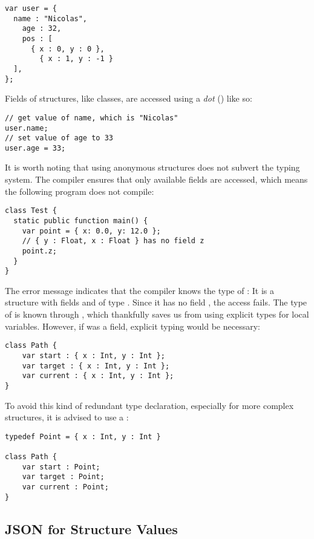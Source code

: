 {

\begin{lstlisting}
var user = {
  name : "Nicolas",
	age : 32,
	pos : [
	  { x : 0, y : 0 },
		{ x : 1, y : -1 }
  ],
};
\end{lstlisting}
Fields of structures, like classes, are accessed using a \emph{dot} () like so:

\begin{lstlisting}
// get value of name, which is "Nicolas"
user.name;
// set value of age to 33
user.age = 33;
\end{lstlisting}
It is worth noting that using anonymous structures does not subvert the typing system. The compiler ensures that only available fields are accessed, which means the following program does not compile:

\begin{lstlisting}
class Test {
  static public function main() {
    var point = { x: 0.0, y: 12.0 };
    // { y : Float, x : Float } has no field z
    point.z;
  }
}
\end{lstlisting}
The error message indicates that the compiler knows the type of : It is a structure with fields  and  of type . Since it has no field , the access fails.
The type of  is known through , which thankfully saves us from using explicit types for local variables. However, if  was a field, explicit typing would be necessary:

\begin{lstlisting}
class Path {
    var start : { x : Int, y : Int };
    var target : { x : Int, y : Int };
    var current : { x : Int, y : Int };
}
\end{lstlisting}
To avoid this kind of redundant type declaration, especially for more complex structures, it is advised to use a :

\begin{lstlisting}
typedef Point = { x : Int, y : Int }

class Path {
    var start : Point;
    var target : Point;
    var current : Point;
}
\end{lstlisting}


\subsection{JSON for Structure Values}
\label{types-structure-json}

}
